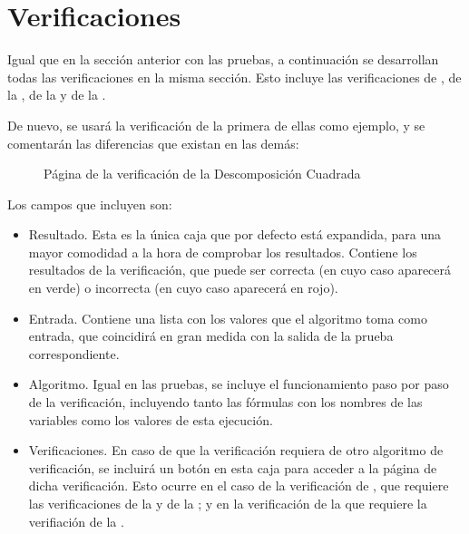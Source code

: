 \section*{Verificaciones}

Igual que en la sección anterior con las pruebas, a continuación se desarrollan todas las verificaciones en la misma sección. Esto incluye las verificaciones de , de la , de la  y de la .

De nuevo, se usará la verificación de la primera de ellas como ejemplo, y se comentarán las diferencias que existan en las demás:
\begin{figure}[H]
    \centering
    \caption{Página de la verificación de la Descomposición Cuadrada}
    \label{im:verifySD}
\end{figure}

Los campos que incluyen son:
\begin{itemize}
    \item Resultado. Esta es la única caja que por defecto está expandida, para una mayor comodidad a la hora de comprobar los resultados. Contiene los resultados de la verificación, que puede ser correcta (en cuyo caso aparecerá en verde) o incorrecta (en cuyo caso aparecerá en rojo).

    \item Entrada. Contiene una lista con los valores que el algoritmo toma como entrada, que coincidirá en gran medida con la salida de la prueba correspondiente.

    \item Algoritmo. Igual en las pruebas, se incluye el funcionamiento paso por paso de la verificación, incluyendo tanto las fórmulas con los nombres de las variables como los valores de esta ejecución.

    \item Verificaciones. En caso de que la verificación requiera de otro algoritmo de verificación, se incluirá un botón en esta caja para acceder a la página de dicha verificación. Esto ocurre en el caso de la verificación de , que requiere las verificaciones de la  y de la ; y en la verificación de la  que requiere la verifiación de la .
\end{itemize}